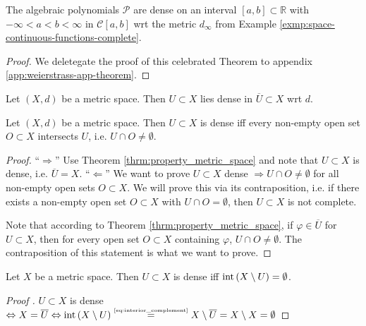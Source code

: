 \begin{exmp}\label{exmp:weierstrass-approx-thrm}
	The algebraic polynomials $\mathcal P$ are dense on an interval $[a, b]\subset \mathbb R$ with $-\infty < a < b < \infty$ in $\mathcal C[a, b]$ wrt the metric $d_{\infty}$ from Example \ref{exmp:space-continuous-functions-complete}. \cite[Corollary 6.12]{iske:approximation}
\end{exmp}

\begin{proof}
	We deletegate the proof of this celebrated Theorem to appendix \ref{app:weierstrass-app-theorem}. 
\end{proof}

\begin{exmp}
	Let $(X, d)$ be a metric space. Then $U\subset X$ lies dense in $\overline{U}\subset X$ wrt $d$.
\end{exmp}

\begin{theorem}\label{thrm:characterization-dense-subsets}
	Let $(X, d)$ be a metric space. Then $U\subset X$ is dense iff every non-empty open set $O\subset X$ intersects $U$, i.e. $U\cap O\ne\emptyset$.
\end{theorem}

\begin{proof}
	\enquote{$\Longrightarrow$} Use Theorem \ref{thrm:property_metric_space} and note that $U\subset X$ is dense, i.e. $\overline{U} = X$.
	\newline\newline\enquote{$\Longleftarrow$} We want to prove $U\subset X$ dense $\Rightarrow U\cap O\ne\emptyset$ for all non-empty open sets $O\subset X$. We will prove this via its contraposition, i.e. if there exists a non-empty open set $O\subset X$ with $U\cap O=\emptyset$, then $U\subset X$ is not complete.
	
	Note that according to Theorem \ref{thrm:property_metric_space}, if $\varphi\in\overline{U}$ for $U\subset X$, then for every open set $O\subset X$ containing $\varphi$, $U\cap O\ne\emptyset$. The contraposition of this statement is what we want to prove.
\end{proof}

\begin{theorem}
	Let $X$ be a metric space. Then $U\subset X$ is dense iff $\text{int}\left( X\setminus U \right) = \emptyset$.
\end{theorem}

\begin{proof}[Proof \cite{937581}]
	$U\subset X$ is dense $\Leftrightarrow X = \overline{U}\Leftrightarrow \text{int}\left( X\setminus U \right) \overset{\tiny\eqref{eq:interior_complement}}{=} X\setminus \overline{U} = X\setminus X = \emptyset$
\end{proof}


